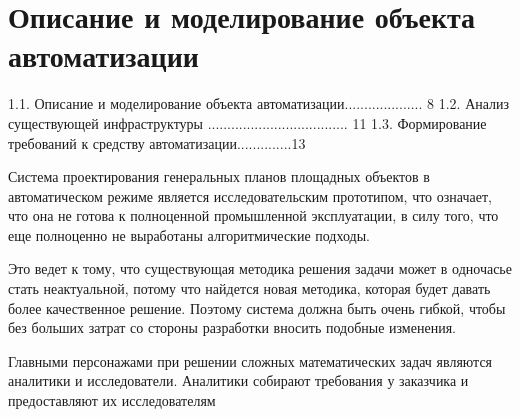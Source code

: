 \section*{\large{Описание и моделирование объекта автоматизации}}

1.1. Описание и моделирование объекта автоматизации.................... 8
1.2. Анализ существующей инфраструктуры .................................... 11
1.3. Формирование требований к средству автоматизации..............13

Система проектирования генеральных планов площадных объектов в автоматическом режиме
является исследовательским прототипом, что означает, что она не готова к полноценной промышленной эксплуатации,
в силу того, что еще полноценно не выработаны алгоритмические подходы.

Это ведет к тому, что существующая методика решения задачи может в одночасье стать неактуальной,
потому что найдется новая методика, которая будет давать более качественное решение.
Поэтому система должна быть очень гибкой, чтобы без больших затрат со стороны разработки вносить подобные изменения.

Главными персонажами при решении сложных математических задач являются аналитики и исследователи.
Аналитики собирают требования у заказчика и предоставляют их исследователям









